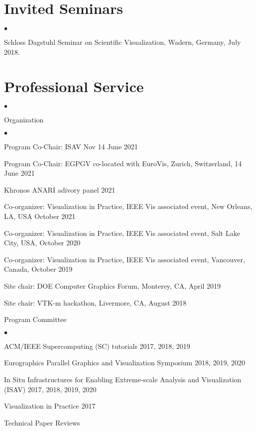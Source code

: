 \documentclass[margin,line]{res}
\newenvironment{list2}{
  \begin{list}{$\bullet$}{%
      \setlength{\itemsep}{0in}
      \setlength{\parsep}{0in} \setlength{\parskip}{0in}
      \setlength{\topsep}{0in} \setlength{\partopsep}{0in}
      \setlength{\leftmargin}{0.2in}}}{\end{list}}
\begin{document}
\begin{resume}
\section{\sc Invited Seminars}
\begin{list2}
	\item Schloss Dagstuhl Seminar on Scientific Visualization,  Wadern,
	Germany, July 2018.
\end{list2}

\section{\sc Professional Service}
\begin{list2}
	\item Organization
		\begin{list2}
			\item Program Co-Chair: ISAV Nov 14 June 2021
			\item Program Co-Chair: EGPGV co-located with EuroVis, Zurich, Switzerland, 14 June 2021
      \item Khronos ANARI adivory panel 2021
			\item Co-organizer: Visualization in Practice, IEEE Vis associated event, New Orleans, LA, USA
 October 2021
			\item Co-organizer: Visualization in Practice, IEEE Vis associated event, Salt Lake City, USA, October 2020
			\item Co-organizer: Visualization in Practice, IEEE Vis associated event, Vancouver, Canada, October 2019
			\item Site chair: DOE Computer Graphics Forum, Monterey, CA, April 2019
			\item Site chair: VTK-m hackathon, Livermore, CA, August 2018
		\end{list2}
	\item Program Committee
		\begin{list2}
			\item ACM/IEEE Supercomputing (SC) tutorials 2017, 2018, 2019
			\item Eurographics Parallel Graphics and Visualization Symposium 2018, 2019, 2020
			\item In Situ Infrastructures for Enabling Extreme-scale Analysis and Visualization (ISAV) 2017, 2018, 2019, 2020
		    \item Visualization in Practice 2017
		\end{list2}
	\item Technical Paper Reviews

\end{list2}
\end{resume}
\end{document}
